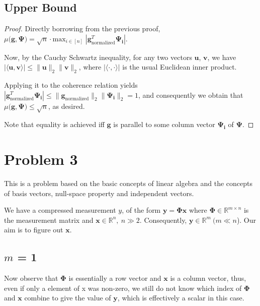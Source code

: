 \documentclass[a4paper,11pt]{article}
\numberwithin{definition}{section}
\numberwithin{mytheorem}{subsection}
\begin{document}
\subsection{Upper Bound}
\begin{proof}
Directly borrowing from the previous proof, $\mu(\boldsymbol{g, \Psi)} = \sqrt{n}\cdot\mathrm{max}_{i\in[n]}\;|\boldsymbol{g}_{\mathrm{normalized}}^T\boldsymbol{\Psi_i}|$.

Now, by the Cauchy Schwartz inequality, for any two vectors $\boldsymbol{u}$, $\boldsymbol{v}$, we have $|\langle \boldsymbol{u}, \boldsymbol{v}\rangle|\leq \lVert \boldsymbol{u}\rVert_2\lVert \boldsymbol{v}\rVert_2$, where $|\langle \cdot, \cdot\rangle|$ is the usual Euclidean inner product.

Applying it to the coherence relation yields $|\boldsymbol{g}_{\mathrm{normalized}}^T\boldsymbol{\Psi_i}| \leq \lVert \boldsymbol{g}_{\mathrm{normalized}}\rVert_2\lVert \boldsymbol{\Psi_i}\rVert_2 = 1$, and consequently we obtain that $\mu(\boldsymbol{g, \Psi)} \leq \sqrt{n}$, as desired.

Note that equality is achieved iff $\boldsymbol{g}$ is parallel to some column vector $\boldsymbol{\Psi_i}$ of $\boldsymbol{\Psi}$.
\end{proof}

\newpage
\section{Problem 3}

This is a problem based on the basic concepts of linear algebra and the concepts of basis vectors, null-space property and independent vectors.

We have a compressed measurement $y$, of the form $\boldsymbol{y} = \boldsymbol{\Phi x}$ where $\boldsymbol{\Phi} \in \mathbb{R}^{m \times n}$ is the measurement matrix and $\boldsymbol{x} \in \mathbb{R}^n, ~n \gg 2$. Consequently, $\boldsymbol{y} \in \mathbb{R}^m ~(m \ll n$). Our aim is to figure out $\boldsymbol{x}$.

\subsection{$m$ = 1}
Now observe that $\boldsymbol{\Phi}$ is essentially a row vector and $\boldsymbol{x}$ is a column vector, thus, even if only a element of x was non-zero, we still do not know which index of $\boldsymbol{\Phi}$ and $\boldsymbol{x}$ combine to give the value of $\boldsymbol{y}$, which is effectively a scalar in this case.
\end{document}
